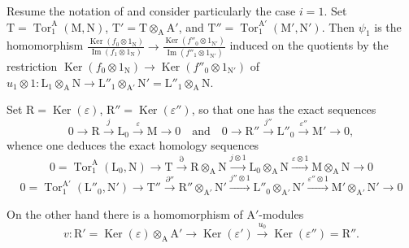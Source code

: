 \begin{env}[11.2.3]
\label{IV.11.2.3}
Resume the notation of  and consider particularly the case $i=1$.
Set
$\mathrm{T}=\operatorname{Tor}_1^\mathrm{A}(\mathrm{M},\mathrm{N})$,
$\mathrm{T}'=\mathrm{T}\otimes_\mathrm{A}\mathrm{A}'$, and
$\mathrm{T}''=\operatorname{Tor}_1^{\mathrm{A}'}
(\mathrm{M}',\mathrm{N}')$. Then $\psi_1$ is the homomorphism $\frac{\operatorname{Ker}(f_0\otimes1_\mathrm{N})}
{\operatorname{Im}(f_1\otimes1_\mathrm{N})}
\longrightarrow
\frac{\operatorname{Ker}(f''_0\otimes1_{\mathrm{N}'})}
{\operatorname{Im}(f''_1\otimes1_{\mathrm{N}'})}$
induced on the quotients by the restriction $\operatorname{Ker}(f_0\otimes1_\mathrm{N})
\longrightarrow
\operatorname{Ker}(f''_0\otimes1_{\mathrm{N}'})$
of
$u_1\otimes1:\mathrm{L}_1\otimes_\mathrm{A}\mathrm{N}\to
\mathrm{L}''_1\otimes_{\mathrm{A}'}\mathrm{N}'=\mathrm{L}''_1\otimes_\mathrm{A}\mathrm{N}$.

Set $\mathrm{R}=\operatorname{Ker}(\varepsilon)$, $\mathrm{R}''=\operatorname{Ker}(\varepsilon'')$, so that one has the exact sequences
\begin{equation}
  0\longrightarrow\mathrm{R}\xrightarrow{j}\mathrm{L}_0\xrightarrow{\varepsilon}\mathrm{M}\longrightarrow 0
  \quad\text{and}\quad
  0\longrightarrow\mathrm{R}''\xrightarrow{j''}\mathrm{L}''_0\xrightarrow{\varepsilon''}\mathrm{M}'\longrightarrow 0,
\end{equation}
whence one deduces the exact homology sequences
\begin{equation}
  0=\operatorname{Tor}_1^\mathrm{A}(\mathrm{L}_0,\mathrm{N})\to\mathrm{T}\xrightarrow{\partial}\mathrm{R}\otimes_\mathrm{A}\mathrm{N}\xrightarrow{j\otimes 1}\mathrm{L}_0\otimes_\mathrm{A}\mathrm{N}\xrightarrow{\varepsilon\otimes 1}\mathrm{M}\otimes_\mathrm{A}\mathrm{N}\to 0
  \label{IV.11.2.3.1}
\tag{11.2.3.1}
\end{equation}
\begin{equation}
  0=\operatorname{Tor}_1^{\mathrm{A}'}(\mathrm{L}''_0,\mathrm{N}')\to\mathrm{T}''\xrightarrow{\partial''}\mathrm{R}''\otimes_{\mathrm{A}'}\mathrm{N}'\xrightarrow{j''\otimes 1}\mathrm{L}''_0\otimes_{\mathrm{A}'}\mathrm{N}'\xrightarrow{\varepsilon''\otimes 1}\mathrm{M}'\otimes_{\mathrm{A}'}\mathrm{N}'\to 0
  \label{IV.11.2.3.2}
\tag{11.2.3.2}
\end{equation}

On the other hand there is a homomorphism of $\mathrm{A}'$-modules
\[
  v:\mathrm{R}'=\operatorname{Ker}(\varepsilon)\otimes_\mathrm{A}\mathrm{A}'\longrightarrow\operatorname{Ker}(\varepsilon')\xrightarrow{u_0}\operatorname{Ker}(\varepsilon'')=\mathrm{R}''.
\]
\end{env}

